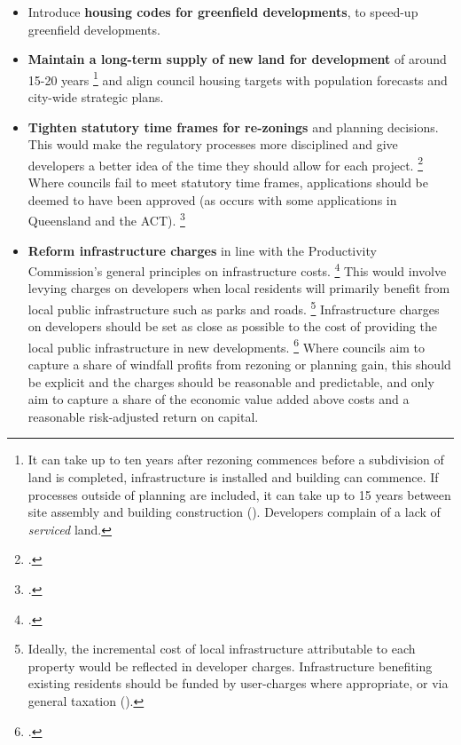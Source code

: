 \begin{itemize}
\item
  Introduce \textbf{housing codes for greenfield developments}, to speed-up greenfield developments.
\item
  \textbf{Maintain a long-term supply of new land for development} of around 15-20 years%
    \footnote{It can take up to ten years after rezoning commences before a subdivision of land is completed, infrastructure is installed and building can commence.
	If processes outside of planning are included, it can take up to 15 years between site assembly and building construction (\textcite[][125, 137]{PC2011PerformanceBenchmark}).
	Developers complain of a lack of \emph{serviced} land.}
  and align council housing targets with population forecasts and city-wide strategic plans.
\item
  \textbf{Tighten statutory time frames for re-zonings} and planning decisions.
  This would make the regulatory processes more disciplined and give developers a better idea of the time they should allow for each project.%
	\footcite[][XLIX]{PC2011PerformanceBenchmark}
  Where councils fail to meet statutory time frames, applications should be deemed to have been approved (as occurs with some applications in Queensland and the ACT).%
	\footcite[][82--83]{PC2011PerformanceBenchmark}
\item
  \textbf{Reform infrastructure charges} in line with the Productivity Commission's general principles on infrastructure costs.%
  	\footcite[][XLVI]{PC2011PerformanceBenchmark}
  This would involve levying charges on developers when local residents will primarily benefit from local public infrastructure such as parks and roads.%
	\footnote{Ideally, the incremental cost of local infrastructure attributable to each property would be reflected in developer charges.
    Infrastructure benefiting existing residents should be funded by user-charges where appropriate, or via general taxation (\textcite[][172]{Commission2014PublicInfastructure}).}
Infrastructure charges on developers should be set as close as possible to the cost of providing the local public infrastructure in new developments.%
	\footcites[][170]{Commission2014PublicInfastructure}[][18]{PC-2017-shifting-dial-potential-of-land}
Where councils aim to capture a share of windfall profits from rezoning or planning gain, this should be explicit and the charges should be reasonable and predictable, and only aim to capture a share of the economic value added above costs and a reasonable risk-adjusted return on capital.%

\end{itemize}
